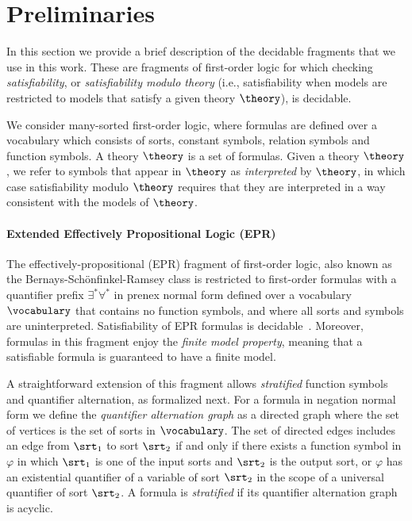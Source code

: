 \section{Preliminaries}
In this section we provide a brief description of the decidable fragments that we use in this work. These are fragments of first-order logic for which checking \emph{satisfiability}, or \emph{satisfiability modulo theory} (i.e., satisfiability when models are restricted to models that satisfy a given theory $\theory$), is decidable.

We consider many-sorted first-order logic, where formulas are defined over a vocabulary which consists of sorts, constant symbols, relation symbols and function symbols.
A theory $\theory$ is a set of formulas. Given a theory $\theory$, we refer to symbols that appear in $\theory$ as \emph{interpreted} by $\theory$, in which case satisfiability modulo $\theory$ requires that they are interpreted in a way consistent with the models of $\theory$.

\paragraph{Extended Effectively Propositional Logic (EPR)}
The effectively-propositional (EPR) fragment of first-order logic,
also known as the Bernays-Sch\"onfinkel-Ramsey class is restricted to
first-order formulas with a quantifier prefix $\exists^{*} \forall^{*}$ in prenex
normal form defined over a vocabulary $\vocabulary$ that contains no function
symbols, and where all sorts and symbols are uninterpreted. Satisfiability of EPR formulas is
decidable~\cite{LEWIS1980317}. Moreover, formulas in this fragment
enjoy the \emph{finite model property}, meaning that a satisfiable
formula is guaranteed to have a finite model.

A straightforward extension of this fragment allows \emph{stratified} function symbols and quantifier alternation, as formalized next.
For a formula in negation normal form we define the \emph{quantifier alternation graph} as a directed graph where the set of vertices is the set of sorts in $\vocabulary$. The set of directed edges includes an edge from $\srt_1$ to sort $\srt_2$ if and only if there exists a function symbol in $\varphi$ in which $\srt_1$ is one of the input sorts and $\srt_2$ is the output sort, or $\varphi$ has an existential quantifier of a variable of sort $\srt_2$ in the scope of a universal quantifier of sort $\srt_2$.
%
A formula is \emph{stratified} if its quantifier alternation graph is acyclic.  


